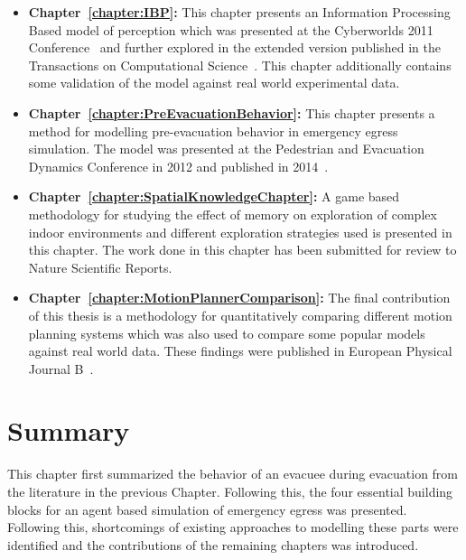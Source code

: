 \begin{itemize}
    \item \textbf{Chapter~\ref{chapter:IBP}:} This chapter presents an Information Processing Based model of perception which was presented at the Cyberworlds 2011 Conference~\cite{Viswanathan:2011uy} and further explored in the extended version published in the Transactions on Computational Science~\cite{Viswanathan:ut}. This chapter additionally contains some validation of the model against real world experimental data.
    \item \textbf{Chapter~\ref{chapter:PreEvacuationBehavior}:} This chapter presents a method for modelling pre-evacuation behavior in emergency egress simulation. The model was presented at the Pedestrian and Evacuation Dynamics Conference in 2012 and published in 2014~\cite{Viswanathan:2012vt}.
    \item \textbf{Chapter~\ref{chapter:SpatialKnowledgeChapter}:} A game based methodology for studying the effect of memory on exploration of complex indoor environments and different exploration strategies used is presented in this chapter. The work done in this chapter has been submitted for review to Nature Scientific Reports.
    \item \textbf{Chapter~\ref{chapter:MotionPlannerComparison}:} The final contribution of this thesis is a methodology for quantitatively comparing different motion planning systems which was also used to compare some popular models against real world data. These findings were published in European Physical Journal B~\cite{Viswanathan2014}.
\end{itemize}


\section{Summary}
\label{IBEVAC:Summary}


This chapter first summarized the behavior of an evacuee during evacuation from the literature in the previous Chapter. Following this, the four essential building blocks for an agent based simulation of emergency egress was presented. Following this, shortcomings of existing approaches to modelling these parts were identified and the contributions of the remaining chapters was introduced.